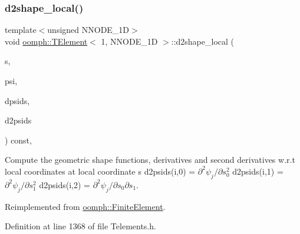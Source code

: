 \mbox{\label{classoomph_1_1TElement_3_011_00_01NNODE__1D_01_4_a3ae243b769f8aad1ba4bbf01c1a3d2d9}} 
\subsubsection{\texorpdfstring{d2shape\+\_\+local()}{d2shape\_local()}}
{\footnotesize\ttfamily template$<$unsigned N\+N\+O\+D\+E\+\_\+1D$>$ \\
void \hyperlink{classoomph_1_1TElement}{oomph\+::\+T\+Element}$<$ 1, N\+N\+O\+D\+E\+\_\+1D $>$\+::d2shape\+\_\+local (\begin{DoxyParamCaption}\item[{const \hyperlink{classoomph_1_1Vector}{Vector}$<$ double $>$ \&}]{s,  }\item[{\hyperlink{classoomph_1_1Shape}{Shape} \&}]{psi,  }\item[{\hyperlink{classoomph_1_1DShape}{D\+Shape} \&}]{dpsids,  }\item[{\hyperlink{classoomph_1_1DShape}{D\+Shape} \&}]{d2psids }\end{DoxyParamCaption}) const\hspace{0.3cm}{\ttfamily [inline]}, {\ttfamily [virtual]}}



Compute the geometric shape functions, derivatives and second derivatives w.\+r.\+t local coordinates at local coordinate s d2psids(i,0) = $ \partial^2 \psi_j / \partial s_0^2 $ d2psids(i,1) = $ \partial^2 \psi_j / \partial s_1^2 $ d2psids(i,2) = $ \partial^2 \psi_j / \partial s_0 \partial s_1 $. 



Reimplemented from \hyperlink{classoomph_1_1FiniteElement_a53e5051582d9da07b9d35da9debd0cd7}{oomph\+::\+Finite\+Element}.



Definition at line 1368 of file Telements.\+h.

\mbox{\label{classoomph_1_1TElement_3_011_00_01NNODE__1D_01_4_a1e49eedf8868cbc51ccb1a6a1b7f7144}} 
